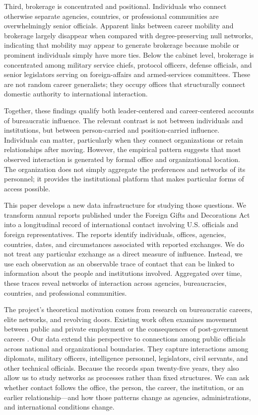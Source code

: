 \documentclass[11pt]{article}
\begin{document}
Third, brokerage is concentrated and positional. Individuals who connect otherwise separate agencies, countries, or professional communities are overwhelmingly senior officials. Apparent links between career mobility and brokerage largely disappear when compared with degree-preserving null networks, indicating that mobility may appear to generate brokerage because mobile or prominent individuals simply have more ties. Below the cabinet level, brokerage is concentrated among military service chiefs, protocol officers, defense officials, and senior legislators serving on foreign-affairs and armed-services committees. These are not random career generalists; they occupy offices that structurally connect domestic authority to international interaction.

Together, these findings qualify both leader-centered and career-centered accounts of bureaucratic influence. The relevant contrast is not between individuals and institutions, but between person-carried and position-carried influence. Individuals can matter, particularly when they connect organizations or retain relationships after moving. However, the empirical pattern suggests that most observed interaction is generated by formal office and organizational location. The organization does not simply aggregate the preferences and networks of its personnel; it provides the institutional platform that makes particular forms of access possible.

This paper develops a new data infrastructure for studying those questions. We transform annual reports published under the Foreign Gifts and Decorations Act into a longitudinal record of international contact involving U.S. officials and foreign representatives. The reports identify individuals, offices, agencies, countries, dates, and circumstances associated with reported exchanges. We do not treat any particular exchange as a direct measure of influence. Instead, we use each observation as an observable trace of contact that can be linked to information about the people and institutions involved. Aggregated over time, these traces reveal networks of interaction across agencies, bureaucracies, countries, and professional communities.

The project’s theoretical motivation comes from research on bureaucratic careers, elite networks, and revolving doors. Existing work often examines movement between public and private employment or the consequences of post-government careers \citep{carnes2023economic,lewis2008politics,teodoro2011bureaucratic}. Our data extend this perspective to connections among public officials across national and organizational boundaries. They capture interactions among diplomats, military officers, intelligence personnel, legislators, civil servants, and other technical officials. Because the records span twenty-five years, they also allow us to study networks as processes rather than fixed structures. We can ask whether contact follows the office, the person, the career, the institution, or an earlier relationship—and how those patterns change as agencies, administrations, and international conditions change.
\end{document}
